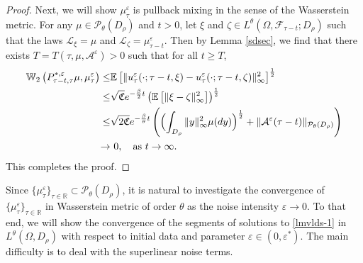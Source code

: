 \documentclass[11pt]{article}
\numberwithin{equation}{section}
\theoremstyle{plain}
\begin{document}
\begin{proof}
 Next, we will show $\mu_\tau^\varepsilon$ is pullback mixing in the sense of the  Wasserstein metric.
 For any $\mu \in \mathcal{P}_{\theta}(D_\rho)$ and $t > 0$,
 let $\xi$ and $\zeta \in L^{\theta}(\Omega, \mathcal{F}_{\tau-t}; D_\rho)$ such that the laws
 $\mathcal{L}_{\xi} = \mu$ and $\mathcal{L}_{\zeta} = \mu_{\tau-t}^\varepsilon$.
 Then
   by Lemma \ref{sdsec},
 we  find that
 there exists
 $T=T(\tau,  \mu, \mathcal{A}^\varepsilon)>0$
 such that for all $t\ge T$,
 \begin{align*} 
   \mathbb{W}_2
                              \left( P_{\tau-t, \tau}^{\ast,\varepsilon} \mu,
                                       \mu_\tau^\varepsilon
                              \right)
 \le & \mathbb{E}
                   \left[ \| u^\varepsilon_\tau(\cdot; \tau-t, \xi) 
                               - u^\varepsilon_\tau(\cdot; \tau-t, \zeta)
                            \|_\infty^2
                   \right]^{\frac{1}{2}}  \nonumber \\
 \le & \sqrt{\mathfrak{C} } e^{-\frac{\beta }{2} t}
                  \left( \mathbb{E}
                                  \left[ \| \xi - \zeta \|_{\infty}^2
                                  \right]
                  \right)^{\frac{1}{2} }  \nonumber\\
 \le & \sqrt{2 \mathfrak{C} } 
               e^{-\frac{\beta }{\theta} t}
                     \left(
                              \Bigl( \int_{D_\rho} \|y\|_{\infty}^2 \mu(dy) 
                              \Bigr)^{\frac{1}{2}}
                              + \| \mathcal{A}^\varepsilon(\tau-t) \|_{\mathcal{P}_{\theta}(D_\rho) }
                    \right)  \nonumber\\
 \rightarrow & \ 0, \ \ \ \text{as} \  t \to \infty.
 \end{align*}
 This completes the proof.
\end{proof}

 Since 
 $\{ \mu_\tau^\varepsilon \}_{\tau \in \mathbb{R} }  
            \subset \mathcal{P}_{\theta}(D_\rho)$,
 it is natural to investigate the convergence of 
    $\{ \mu_\tau^\varepsilon \}_{\tau \in \mathbb{R} }$ 
 in Wasserstein metric of order $\theta$
 as the noise intensity $\varepsilon \to 0$.  
To that  end,
 we will show the convergence of the segments of solutions to \eqref{lmvlds-1} in $L^\theta(\Omega, D_\rho)$ with respect to initial data and parameter $\varepsilon \in (0, \varepsilon^*)$.
 The main difficulty
 is to deal   with
 the  superlinear noise terms.
 
\end{document}

